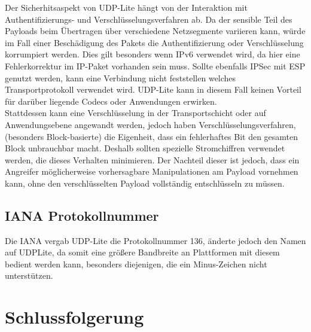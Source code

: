 \documentclass{template}
\begin{document}
Der Sicherhitsaspekt von UDP-Lite hängt von der Interaktion mit
Authentifizierungs- und Verschlüsselungsverfahren ab. Da der sensible
Teil des Payloads beim Übertragen über verschiedene Netzsegmente variieren
kann, würde im Fall einer Beschädigung des Pakets
die Authentifizierung oder Verschlüsselung korrumpiert werden.
Dies gilt besonders wenn IPv6 verwendet wird, da hier eine Fehlerkorrektur
im IP-Paket vorhanden sein muss. Sollte ebenfalls IPSec mit ESP genutzt werden,
kann eine Verbindung nicht feststellen welches Transportprotokoll
verwendet wird. UDP-Lite kann in diesem Fall keinen Vorteil für
darüber liegende Codecs oder Anwendungen erwirken.\\

Stattdessen kann eine Verschlüsselung in der Transportschicht oder auf
Anwendungsebene angewandt werden, jedoch haben Verschlüsselungsverfahren,
(besonders Block-basierte) die Eigenheit, dass ein fehlerhaftes Bit
den gesamten Block unbrauchbar macht. Deshalb sollten spezielle
Stromchiffren verwendet werden, die dieses Verhalten minimieren.
Der Nachteil dieser ist jedoch, dass ein Angreifer möglicherweise
vorhersagbare Manipulationen am Payload vornehmen kann, ohne den
verschlüsselten Payload vollständig entschlüsseln zu müssen.\\



\subsection{IANA Protokollnummer}

Die IANA vergab UDP-Lite die Protokollnummer 136, änderte jedoch den
Namen auf UDPLite, da somit eine größere Bandbreite an Plattformen
mit diesem bedient werden kann, besonders diejenigen, die ein Minus-Zeichen
nicht unterstützen.












\section{Schlussfolgerung}
\end{document}
